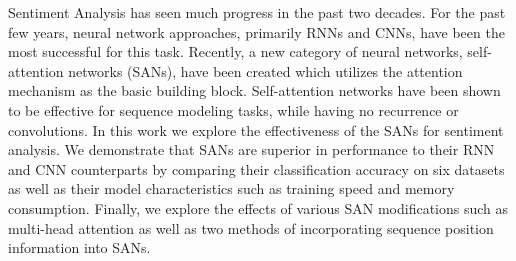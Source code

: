 Sentiment Analysis has seen much progress in the past two decades. For the past few years, neural network approaches, primarily RNNs and CNNs, have been the most successful for this task. Recently, a new category of neural networks, self-attention networks (SANs), have been created which utilizes the attention mechanism as the basic building block. Self-attention networks have been shown to be effective for sequence modeling tasks, while having no recurrence or convolutions. In this work we explore the effectiveness of the SANs for sentiment analysis. We demonstrate that SANs are superior in performance to their RNN and CNN counterparts by comparing their classification accuracy on six datasets as well as their model characteristics such as training speed and memory consumption. Finally, we explore the effects of various SAN modifications such as multi-head attention as well as two methods of incorporating sequence position information into SANs.

